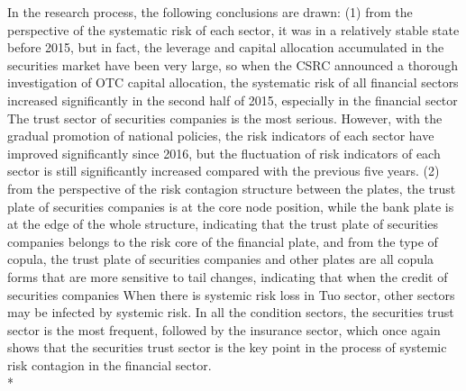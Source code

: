 \begin{eabstract}
In the research process, the following conclusions are drawn: (1) from the perspective of the systematic risk of each sector, it was in a relatively stable state before 2015, but in fact, the leverage and capital allocation accumulated in the securities market have been very large, so when the CSRC announced a thorough investigation of OTC capital allocation, the systematic risk of all financial sectors increased significantly in the second half of 2015, especially in the financial sector The trust sector of securities companies is the most serious. However, with the gradual promotion of national policies, the risk indicators of each sector have improved significantly since 2016, but the fluctuation of risk indicators of each sector is still significantly increased compared with the previous five years. (2) from the perspective of the risk contagion structure between the plates, the trust plate of securities companies is at the core node position, while the bank plate is at the edge of the whole structure, indicating that the trust plate of securities companies belongs to the risk core of the financial plate, and from the type of copula, the trust plate of securities companies and other plates are all copula forms that are more sensitive to tail changes, indicating that when the credit of securities companies When there is systemic risk loss in Tuo sector, other sectors may be infected by systemic risk. In all the condition sectors, the securities trust sector is the most frequent, followed by the insurance sector, which once again shows that the securities trust sector is the key point in the process of systemic risk contagion in the financial sector.
  \\*

\end{eabstract}

